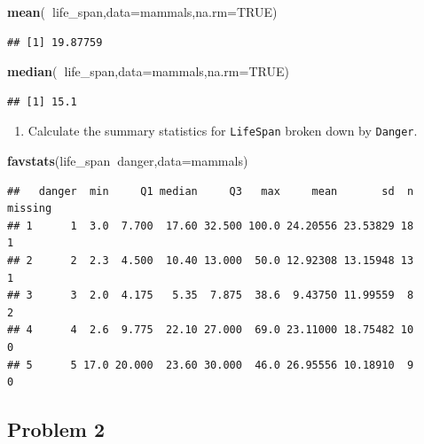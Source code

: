 \documentclass[
]{book}
\newenvironment{Shaded}{\begin{snugshade}}{\end{snugshade}}
\newcommand{\DataTypeTok}[1]{\textcolor[rgb]{0.13,0.29,0.53}{#1}}
\newcommand{\KeywordTok}[1]{\textcolor[rgb]{0.13,0.29,0.53}{\textbf{#1}}}
\newcommand{\NormalTok}[1]{#1}
\newcommand{\OperatorTok}[1]{\textcolor[rgb]{0.81,0.36,0.00}{\textbf{#1}}}
\newcommand{\OtherTok}[1]{\textcolor[rgb]{0.56,0.35,0.01}{#1}}
\providecommand{\tightlist}{%
  \setlength{\itemsep}{0pt}\setlength{\parskip}{0pt}}
\begin{document}
\begin{Shaded}
\begin{Highlighting}[]
\KeywordTok{mean}\NormalTok{(}\OperatorTok{~}\NormalTok{life_span,}\DataTypeTok{data=}\NormalTok{mammals,}\DataTypeTok{na.rm=}\OtherTok{TRUE}\NormalTok{)}
\end{Highlighting}
\end{Shaded}

\begin{verbatim}
## [1] 19.87759
\end{verbatim}

\begin{Shaded}
\begin{Highlighting}[]
\KeywordTok{median}\NormalTok{(}\OperatorTok{~}\NormalTok{life_span,}\DataTypeTok{data=}\NormalTok{mammals,}\DataTypeTok{na.rm=}\OtherTok{TRUE}\NormalTok{)}
\end{Highlighting}
\end{Shaded}

\begin{verbatim}
## [1] 15.1
\end{verbatim}

\begin{enumerate}
\def\labelenumi{\alph{enumi}.}
\setcounter{enumi}{6}
\tightlist
\item
  Calculate the summary statistics for \texttt{LifeSpan} broken down by \texttt{Danger}.
\end{enumerate}

\begin{Shaded}
\begin{Highlighting}[]
\KeywordTok{favstats}\NormalTok{(life_span}\OperatorTok{~}\NormalTok{danger,}\DataTypeTok{data=}\NormalTok{mammals)}
\end{Highlighting}
\end{Shaded}

\begin{verbatim}
##   danger  min     Q1 median     Q3   max     mean       sd  n missing
## 1      1  3.0  7.700  17.60 32.500 100.0 24.20556 23.53829 18       1
## 2      2  2.3  4.500  10.40 13.000  50.0 12.92308 13.15948 13       1
## 3      3  2.0  4.175   5.35  7.875  38.6  9.43750 11.99559  8       2
## 4      4  2.6  9.775  22.10 27.000  69.0 23.11000 18.75482 10       0
## 5      5 17.0 20.000  23.60 30.000  46.0 26.95556 10.18910  9       0
\end{verbatim}

\hypertarget{problem-2-4}{%
\subsection{Problem 2}\label{problem-2-4}}
\end{document}
